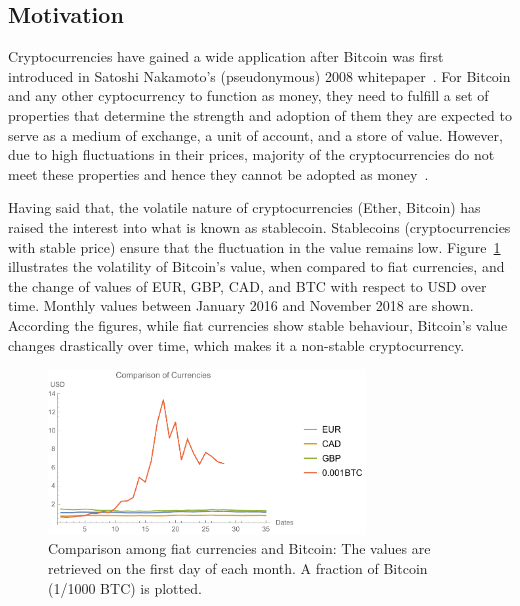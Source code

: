 
\subsection{Motivation} %
Cryptocurrencies have gained a wide application after Bitcoin was first introduced in Satoshi Nakamoto’s (pseudonymous) 2008 whitepaper~\cite{nakamoto2008bitcoin}. For Bitcoin and any other cyptocurrency to function as money, they need to fulfill a set of properties that determine the strength and adoption of them \ie they are expected to serve as a medium of exchange, a unit of account, and a store of value. However, due to high fluctuations in their prices, majority of the cryptocurrencies do not meet these properties and hence they cannot be adopted as money~\cite{overview}.

Having said that, the volatile nature of cryptocurrencies (\eg Ether, Bitcoin) has raised the interest into what is known as stablecoin. Stablecoins (\ie cryptocurrencies with stable price) ensure that the fluctuation in the value remains low. Figure~\ref{fig:btcandfiat} illustrates the volatility of Bitcoin's value, when compared to fiat currencies, and the change of values of EUR, GBP, CAD, and BTC with respect to USD over time. Monthly values between January 2016 and November 2018 are shown. According the figures, while fiat currencies show stable behaviour, Bitcoin's value changes drastically over time, which makes it a non-stable cryptocurrency.

\begin{figure}[!htb]
	\centering
	\includegraphics[width=0.75\textwidth]{figures/graph1.pdf}
	\caption{\label{fig:btcandfiat}Comparison among fiat currencies and Bitcoin: The values are retrieved on the first day of each month. A fraction of Bitcoin (1/1000 BTC) is plotted.}
\end{figure}

